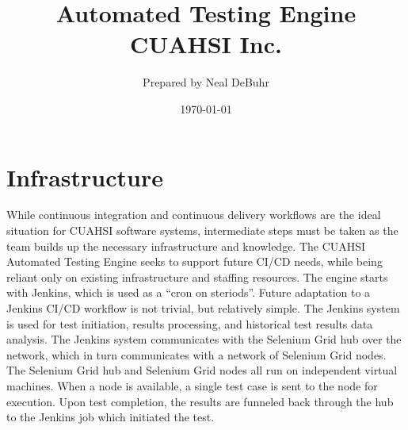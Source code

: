 \documentclass[10pt]{article}
\title{%
  Automated Testing Engine \\
  {\large \subtitleaccent~~CUAHSI Inc.~~\subtitleaccent}}
\author{Prepared by Neal DeBuhr}
\date{\today}
\begin{document}
\maketitle

\newpage
\section{Infrastructure}
While continuous integration and continuous delivery workflows are the ideal situation for CUAHSI software systems, intermediate steps must be taken as the team builds up the necessary infrastructure and knowledge.  The CUAHSI Automated Testing Engine seeks to support future CI/CD needs, while being reliant only on existing infrastructure and staffing resources.  The engine starts with Jenkins, which is used as a ``cron on steriods''.  Future adaptation to a Jenkins CI/CD workflow is not trivial, but relatively simple.  The Jenkins system is used for test initiation, results processing, and historical test results data analysis.  The Jenkins system communicates with the Selenium Grid hub over the network, which in turn communicates with a network of Selenium Grid nodes.  The Selenium Grid hub and Selenium Grid nodes all run on independent virtual machines.  When a node is available, a single test case is sent to the node for execution.  Upon test completion, the results are funneled back through the hub to the Jenkins job which initiated the test.
\end{document}

